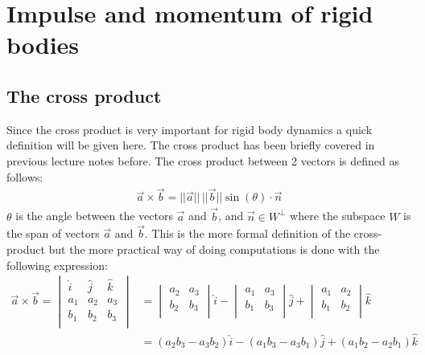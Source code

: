 \documentclass[11pt, a4paper]{article}
\begin{document}
\section{Impulse and momentum of rigid bodies}
\subsection{The cross product}
Since the cross product is very important for rigid body dynamics a quick definition will be given here. The cross product has been briefly covered in previous lecture notes before. The cross product between 2 vectors is defined as follows:
\begin{gather}
  \vec{a} \times \vec{b} = ||\vec{a}||\,||\vec{b}||\sin(\theta)\cdot \vec{n}
\end{gather}
$\theta$ is the angle between the vectors $\vec{a}$ and $\vec{b}$, and $\vec{n} \in W^\perp$ where the subspace $W$ is the span of vectors $\vec{a}$ and $\vec{b}$. This is the more formal definition of the cross-product but the more practical way of doing computations is done with the following expression:
\begin{align}
  \vec{a} \times \vec{b} =
  \begin{vmatrix}
    \hat{i} & \hat{j} & \hat{k}\\
        a_1 & a_2     & a_3\\
        b_1 & b_2     & b_3\\
  \end{vmatrix}
  &=
  \begin{vmatrix}
    a_2 & a_3\\
    b_2 & b_3\\
  \end{vmatrix}
  \hat{i} -
  \begin{vmatrix}
    a_1 & a_3\\
    b_1 & b_3\\
  \end{vmatrix}
  \hat{j} +
  \begin{vmatrix}
    a_1 & a_2\\
    b_1 & b_2\\
  \end{vmatrix}
  \hat{k}\\
  &= (a_2b_3 - a_3b_2)\hat{i} - (a_1b_3 - a_3b_1)\hat{j} + (a_1b_2 - a_2b_1)\hat{k}
\end{align}
\end{document}
